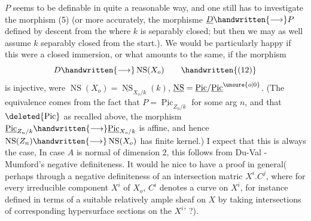  $P$ seems to be definable in quite a reasonable way, and one still has to investigate the morphism (5) (or more accurately, the morphisme $\underline{D}\handwritten{\longrightarrow}P$ defined by descent from the  where $k$ is separably closed; but then we may as well assume $k$ separably closed from the start\handwritten{,}.). We would be particularly happy if this were a closed immersion, or what amounts to the same, if the morphism
\[
D\handwritten{\longrightarrow}\operatorname{NS}(X_o)
\tag*{\handwritten{(12)}}
\]
is injective, were $\operatorname{NS}(X_o)=\underline{\operatorname{NS}}_{X_o/k}(k)$, $\underline{\operatorname{NS}}=\underline{\operatorname{Pic}}/\underline{\operatorname{Pic}}^{\unsure{o|0}}$. (The equivalence comes from the fact that $P=\underline{\operatorname{Pic}}_{Z_n/k}$ for some arg $n$, and that $\deleted{\operatorname{Pic}}$
as recalled above, the morphism $\underline{\operatorname{Pic}}_{Z_n/k}\handwritten{\longrightarrow}\underline{\operatorname{Pic}}_{X_o/k}$ is affine, and hence $\operatorname{NS}(Z_n)\handwritten{\longrightarrow}\operatorname{NS}(X_o)$ has finite kernel.) I expect that this is always the case,  In case $A$ is normal of dimension $2$, this follows from Du-Val - Mumford's negative definiteness. It would he nice to have a proof in general( perhaps through a negative definiteness of an intersection matric $X^i.C^j$, where for every irreducible component $X^i$ of $X_o$, $C^i$ denotes a  curve on $X^i$, for instance defined in terms of a suitable  relatively ample sheaf on $X$ by taking intersections of corresponding hypersurface sections on the $X^i$' ?).

